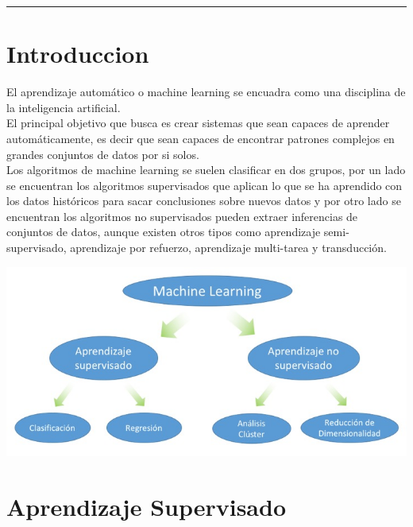 \documentclass[11pt,a4paper]{article}
\begin{document}
		\vspace{\baselineskip}
					
		\rule{167mm}{0.1mm}
		
		\vspace{\baselineskip}
		
		\section{Introduccion}
		
		El aprendizaje automático o machine learning se encuadra como una disciplina de la inteligencia artificial.\\

        El principal objetivo que busca es crear sistemas que sean capaces de aprender automáticamente, es decir que sean capaces de encontrar patrones complejos en grandes conjuntos de datos por si solos.\\

        Los algoritmos de machine learning se suelen clasificar en dos grupos, por un lado se encuentran los algoritmos supervisados que aplican lo que se ha aprendido con los datos históricos para sacar conclusiones sobre nuevos datos y por otro lado se encuentran los algoritmos no supervisados pueden extraer inferencias de conjuntos de datos, aunque existen otros tipos como aprendizaje semi-supervisado, aprendizaje por refuerzo, aprendizaje multi-tarea y transducción.\\
		
		\begin{center}
		\includegraphics[scale=0.5]{./Imagenes/MachineLearning}
		\end{center}
		
		\section{Aprendizaje Supervisado}
		
\end{document}

